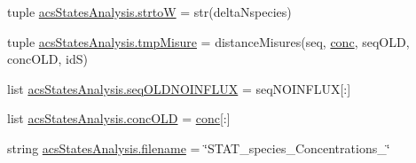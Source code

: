 \begin{DoxyCompactItemize}
tuple \hyperlink{a00098_abe05028c33fab522e3b940195eaaa586}{acs\-States\-Analysis.\-strto\-W} = str(delta\-Nspecies)
\item 
tuple \hyperlink{a00098_a45529ce20ca353ca8ac251b4e88c91ff}{acs\-States\-Analysis.\-tmp\-Misure} = distance\-Misures(seq, \hyperlink{a00021_a941dee33725f074478fdcbf15e1c35ae}{conc}, seq\-O\-L\-D, conc\-O\-L\-D, id\-S)
\item 
list \hyperlink{a00098_ac796dfff897c2b81d04e71e4f3306d16}{acs\-States\-Analysis.\-seq\-O\-L\-D\-N\-O\-I\-N\-F\-L\-U\-X} = seq\-N\-O\-I\-N\-F\-L\-U\-X\mbox{[}\-:\mbox{]}
\item 
list \hyperlink{a00098_a15f99c617a2dc95e52f741ee99e71b7a}{acs\-States\-Analysis.\-conc\-O\-L\-D} = \hyperlink{a00021_a941dee33725f074478fdcbf15e1c35ae}{conc}\mbox{[}\-:\mbox{]}
\item 
string \hyperlink{a00098_a69b59a10e5dc62a6e0d5325e9a27e5c6}{acs\-States\-Analysis.\-filename} = \char`\"{}S\-T\-A\-T\-\_\-species\-\_\-\-Concentrations\-\_\-\char`\"{}
\end{DoxyCompactItemize}
